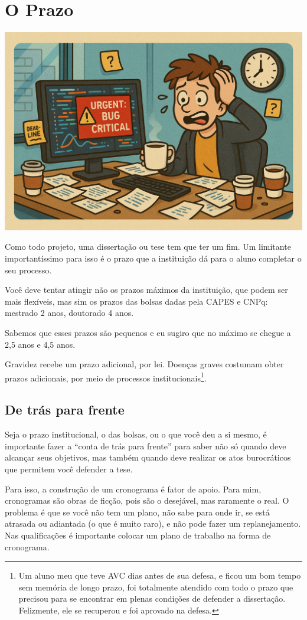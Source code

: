 \chapter{O Prazo}

\begin{center}
\includegraphics[width=0.5\linewidth]{Images/prazo.png}    
\end{center}
\vspace{0.5cm}

Como todo projeto, uma dissertação ou tese tem que ter um fim. Um limitante importantíssimo para isso é o prazo que a instituição dá para o aluno completar o seu processo.

Você deve tentar atingir não os prazos máximos da instituição, que podem ser mais flexíveis, mas sim os prazos das bolsas dadas pela CAPES e CNPq: mestrado 2 anos, doutorado 4 anos.

Sabemos que esses prazos são pequenos e eu sugiro que no máximo se chegue a 2,5 anos e 4,5 anos.

Gravidez recebe um prazo adicional, por lei. Doenças graves costumam obter prazos adicionais, por meio de processos institucionais\footnote{Um aluno meu que teve AVC dias antes de sua defesa, e ficou um bom tempo sem memória de longo prazo, foi totalmente atendido com todo o prazo que precisou para se encontrar em plenas condições de defender a dissertação. Felizmente, ele se recuperou e foi aprovado na defesa.}.

\section{De trás para frente}

Seja o prazo institucional, o das bolsas, ou o que você deu a si mesmo, é importante fazer a ``conta de trás para frente'' para saber não só quando deve alcançar seus objetivos, mas também quando deve realizar os atos burocráticos que permitem você defender a tese.

Para isso, a construção de um cronograma é fator de apoio. Para mim, cronogramas são obras de ficção, pois são o desejável, mas raramente o real. O problema é que se você não tem um plano, não sabe para onde ir, se está atrasada ou adiantada (o que é muito raro), e não pode fazer um replanejamento. Nas qualificações é importante colocar um plano de trabalho na forma de cronograma.


